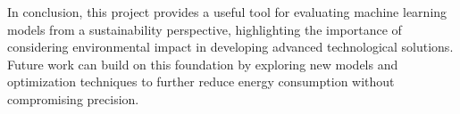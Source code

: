 \documentclass[a4paper, 12pt, oneside]{book}
\begin{document}
In conclusion, this project provides a useful tool for evaluating machine learning models from a sustainability perspective, highlighting the importance of considering environmental impact in developing advanced technological solutions. Future work can build on this foundation by exploring new models and optimization techniques to further reduce energy consumption without compromising precision.





\tableofcontents 
\thispagestyle{empty}
\cleardoublepage

\thispagestyle{empty}
\listoffigures %
\thispagestyle{empty}

\cleardoublepage

\mainmatter
\pagestyle{headings}







\printglossary[type=\acronymtype]
\printglossary

\cleardoublepage
\appendix


\cleardoublepage
\raggedright\printbibliography[heading=bibintoc,title={Referencias}]
\end{document}
